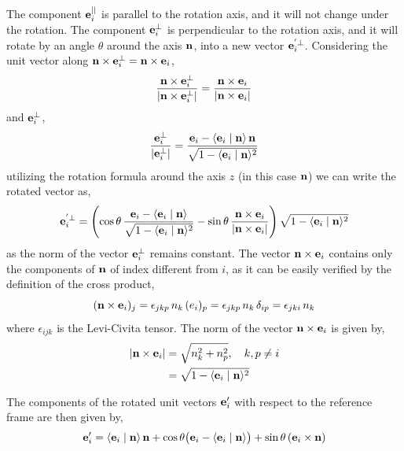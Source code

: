 \documentclass[12pt]{article}
\newcommand{\ip}[2]{\langle #1 \mid #2 \rangle}
\begin{document}
The component $\vb{e}_i^{||}$ is parallel to the rotation axis, and it will not change under
the rotation. The component $\vb{e}_i^{\perp}$ is perpendicular to the rotation axis, and it
will rotate by an angle $\theta$ around the axis $\vb{n}$, into a new vector
$\vb{e}_i^{'\perp}$. Considering the unit vector along
$\vb{n} \times \vb{e}_i^{\perp} = \vb{n} \times \vb{e}_i$,
\begin{equation}
  \frac{\vb{n} \times \vb{e}_i^{\perp}}{|\vb{n} \times \vb{e}_i^{\perp}|}
  = \frac{\vb{n} \times \vb{e}_i}{|\vb{n} \times \vb{e}_i|}
\end{equation}
and $\vb{e}_i^{\perp}$,
\begin{equation}
  \frac{\vb{e}_i^{\perp}}{|\vb{e}_i^{\perp}|}
  = \frac{\vb{e}_i - \ip{\vb{e}_i}{\vb{n}}\,\vb{n}}{\sqrt{1 - \ip{\vb{e}_i}{\vb{n}}^2}}
\end{equation}
utilizing the rotation formula around the axis $z$ (in this case $\vb{n}$) we can write the
rotated vector as,
\begin{equation}
  \vb{e}_i^{'\perp} =
  \left(
    \cos\theta\,\frac{\vb{e}_i - \ip{\vb{e}_i}{\vb{n}}}{\sqrt{1 - \ip{\vb{e}_i}{\vb{n}}^2}}
    - \sin\theta\,\frac{\vb{n} \times \vb{e}_i}{|\vb{n} \times \vb{e}_i|}
  \right)\sqrt{1 - \ip{\vb{e}_i}{\vb{n}}^2}
\end{equation}
as the norm of the vector $\vb{e}_i^{\perp}$ remains constant. The vector
$\vb{n} \times \vb{e}_i$ contains only the components of $\vb{n}$ of index different from
$i$, as it can be easily verified by the definition of the cross product,
\begin{equation}
  (\vb{n} \times \vb{e}_i)_j = \epsilon_{jkp}\, n_k\,(e_i)_p = \epsilon_{jkp}\, n_k\,\delta_{ip} = \epsilon_{jki}\, n_k
\end{equation}
where $\epsilon_{ijk}$ is the Levi-Civita tensor. The norm of the vector $\vb{n} \times \vb{e}_i$ is given by,
\begin{align}
  |\vb{n} \times \vb{e}_i| &= \sqrt{n_k^2 + n_p^2}, \quad k, p \neq i \\
                            &= \sqrt{1 - \ip{\vb{e}_i}{\vb{n}}^2}
\end{align}

The components of the rotated unit vectors $\vb{e}'_i$ with respect to the reference frame
are then given by,
\begin{equation}
  \vb{e}'_i = \ip{\vb{e}_i}{\vb{n}}\,\vb{n}
    + \cos\theta\bigl(\vb{e}_i - \ip{\vb{e}_i}{\vb{n}}\bigr)
    + \sin\theta\,(\vb{e}_i \times \vb{n})
\end{equation}
\end{document}
